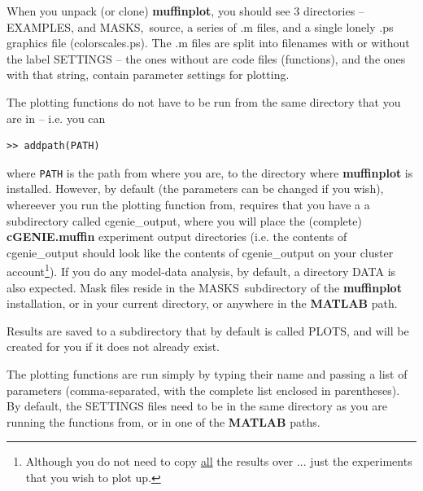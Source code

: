 \documentclass[11pt,fleqn]{book} %
\begin{document}
When you unpack (or clone) \textbf{muffinplot}, you should see 3 directories -- \footnotesize\textsf{EXAMPLES}\normalsize, and \footnotesize\textsf{MASKS}\normalsize,\ \footnotesize\textsf{source}\normalsize, a series of \footnotesize\textsf{.m }\normalsize files, and a single lonely \footnotesize\textsf{.ps }\normalsize graphics file (\footnotesize\textsf{colorscales.ps}\normalsize). The \footnotesize\textsf{.m }\normalsize files are split into filenames with or without the label \footnotesize\textsf{SETTINGS }\normalsize -- the ones without are code files (functions), and the ones with that string, contain parameter settings for plotting.

The plotting functions do not have to be run from the same directory that you are in -- i.e. you can 
\vspace{-2pt}\begin{verbatim}
>> addpath(PATH)
\end{verbatim}\vspace{-2pt}
where \texttt{PATH} is the path from where you are, to the directory where \textbf{muffinplot} is installed. However, by default (the parameters can be changed if you wish), whereever you run the plotting function from, requires that you have a a subdirectory called \footnotesize\textsf{cgenie\_output}\normalsize, where you will place the (complete) \textbf{cGENIE.muffin} experiment output directories (i.e. the contents of \footnotesize\textsf{cgenie\_output }\normalsize should look like the contents of \footnotesize\textsf{cgenie\_output }\normalsize on your cluster account\footnote{Although you do not need to copy \uline{all} the results over ... just the experiments that you wish to plot up.}). If you do any model-data analysis, by default, a directory \footnotesize\textsf{DATA }\normalsize is also expected. Mask files reside in the \footnotesize\textsf{MASKS}\normalsize\ subdirectory of the \textbf{muffinplot} installation, or in your current directory, or anywhere in the \textbf{MATLAB} path.

Results are saved to a subdirectory that by default is called \footnotesize\textsf{PLOTS}\normalsize, and will be created for you if it does not already exist.

The plotting functions are run simply by typing their name and passing a list of parameters (comma-separated, with the complete list enclosed in parentheses). By default,   the \footnotesize\textsf{SETTINGS }\normalsize files need to be in the same directory as you are running the functions from, or in one of the \textbf{MATLAB} paths.
\end{document}
